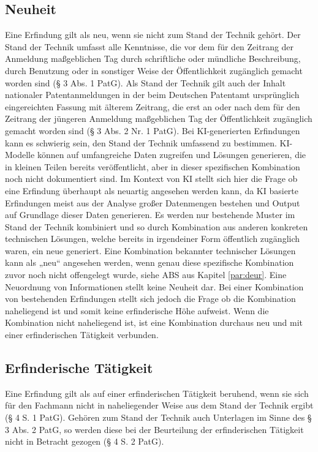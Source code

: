 \subsection{Neuheit}
Eine Erfindung gilt als neu, wenn sie nicht zum Stand der Technik gehört. 
Der Stand der Technik umfasst alle Kenntnisse, 
die vor dem für den Zeitrang der Anmeldung
maßgeblichen Tag durch schriftliche 
oder mündliche Beschreibung, durch Benutzung oder in
sonstiger Weise der Öffentlichkeit zugänglich gemacht worden sind (§ 3 Abs. 1 PatG).
Als Stand der Technik gilt auch der Inhalt nationaler Patentanmeldungen 
in der beim Deutschen
Patentamt ursprünglich eingereichten Fassung mit älterem Zeitrang, 
die erst an oder nach dem für
den Zeitrang der jüngeren Anmeldung maßgeblichen Tag der Öffentlichkeit 
zugänglich gemacht
worden sind (§ 3 Abs. 2 Nr. 1 PatG). 
Bei KI-generierten Erfindungen kann es schwierig sein, 
den Stand der Technik umfassend zu bestimmen. 
KI-Modelle können auf umfangreiche Daten zugreifen und Lösungen generieren, 
die in kleinen Teilen bereits veröffentlicht, 
aber in dieser spezifischen Kombination noch nicht dokumentiert sind.
Im Kontext von KI stellt sich hier die Frage 
ob eine Erfindung überhaupt als neuartig angesehen werden kann, 
da KI basierte Erfindungen meist aus der Analyse großer Datenmengen bestehen
und Output auf Grundlage dieser Daten generieren. 
Es werden nur bestehende Muster im Stand der Technik kombiniert 
und so durch Kombination aus anderen konkreten technischen Lösungen, 
welche bereits in irgendeiner Form öffentlich zugänglich waren, ein neue generiert.
Eine Kombination bekannter technischer Lösungen kann als „neu“ angesehen werden,
wenn genau diese spezifische Kombination zuvor noch nicht offengelegt wurde,
siehe ABS aus Kapitel \ref{par:deur}.
Eine Neuordnung von Informationen stellt keine Neuheit dar.
Bei einer Kombination von 
bestehenden Erfindungen stellt sich jedoch die Frage 
ob die Kombination naheliegend ist und
somit keine erfinderische Höhe aufweist. Wenn die Kombination
nicht naheliegend ist, ist eine Kombination durchaus 
neu und mit einer erfinderischen Tätigkeit verbunden.


\subsection{Erfinderische Tätigkeit}


Eine Erfindung gilt als auf einer erfinderischen Tätigkeit beruhend, 
wenn sie sich für den Fachmann
nicht in naheliegender Weise aus dem Stand der Technik ergibt (§ 4 S. 1 PatG). 
Gehören zum Stand
der Technik auch Unterlagen im Sinne des § 3 Abs. 2 PatG, 
so werden diese bei der Beurteilung der
erfinderischen Tätigkeit nicht in Betracht gezogen (§ 4 S. 2 PatG).

